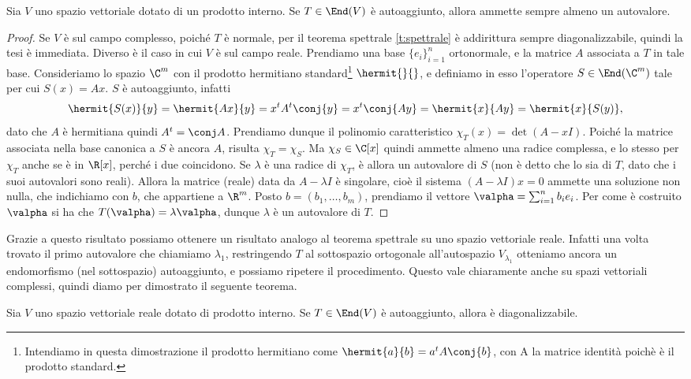 \begin{teorema}
	Sia $V$ uno spazio vettoriale dotato di un prodotto interno.
	Se $T\in\End(V)$ è autoaggiunto, allora ammette sempre almeno un autovalore.
\end{teorema}
\begin{proof}
	Se $V$ è sul campo complesso, poich\'e $T$ è normale, per il teorema spettrale \ref{t:spettrale} è addirittura sempre diagonalizzabile, quindi la tesi è immediata.
	Diverso è il caso in cui $V$ è sul campo reale.
	Prendiamo una base $\{  e_i\}_{i=1}^n$ ortonormale, e la matrice $A$ associata a $T$ in tale base.
	Consideriamo lo spazio $\C^m$ con il prodotto hermitiano standard\footnote{Intendiamo in questa dimostrazione il prodotto hermitiano come $\hermit{  a}{  b}=  a^t A\conj{  b}$, con A la matrice identità poichè è il prodotto standard.} $\hermit{}{}$, e definiamo in esso l'operatore $S\in\End(\C^m)$ tale per cui $S(  x)=A  x$.
	$S$ è autoaggiunto, infatti
	\begin{equation}
		\hermit{S(  x)}{  y}=\hermit{A  x}{  y}=  x^tA^t\conj{  y}=  x^t\conj{A  y}=\hermit{  x}{A  y}=\hermit{  x}{S(  y)},
	\end{equation}
	dato che $A$ è hermitiana quindi $A^t=\conj A$.
	Prendiamo dunque il polinomio caratteristico $\chi_T(x)=\det(A-xI)$.
	Poich\'e la matrice associata nella base canonica a $S$ è ancora $A$, risulta $\chi_T=\chi_S$.
	Ma $\chi_S\in\C[x]$ quindi ammette almeno una radice complessa, e lo stesso per $\chi_T$ anche se è in $\R[x]$, perch\'e i due coincidono.
	Se $\lambda$ è una radice di $\chi_T$, è allora un autovalore di $S$ (non è detto che lo sia di $T$, dato che i suoi autovalori sono reali).
	Allora la matrice (reale) data da $A-\lambda I$ è singolare, cioè il sistema $(A-\lambda I)  x=  0$ ammette una soluzione non nulla, che indichiamo con $  b$, che appartiene a $\R^m$.
	Posto $  b=(b_1,\dots,b_m)$, prendiamo il vettore $\valpha=\sum_{i=1}^nb_i  e_i$.
	Per come è costruito $\valpha$ si ha che $T(\valpha)=\lambda\valpha$, dunque $\lambda$ è un autovalore di $T$.
\end{proof}
Grazie a questo risultato possiamo ottenere un risultato analogo al teorema spettrale su uno spazio vettoriale reale.
Infatti una volta trovato il primo autovalore che chiamiamo $\lambda_1$, restringendo $T$ al sottospazio ortogonale all'autospazio $V_{\lambda_1}$ otteniamo ancora un endomorfismo (nel sottospazio) autoaggiunto, e possiamo ripetere il procedimento.
Questo vale chiaramente anche su spazi vettoriali complessi, quindi diamo per dimostrato il seguente teorema.
\begin{teorema}
	Sia $V$ uno spazio vettoriale reale dotato di prodotto interno.
	Se $T\in\End(V)$ è autoaggiunto, allora è diagonalizzabile.
\end{teorema}

